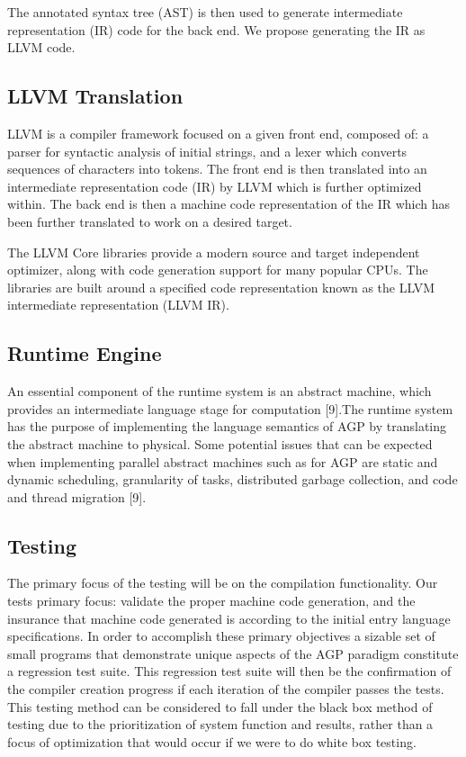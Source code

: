 \documentclass[11pt]{article}
\begin{document}
The annotated syntax tree (AST) is then used to generate intermediate representation (IR) code for the back end. We propose generating the IR as LLVM code.


\subsection{LLVM Translation}

LLVM is a compiler framework focused on a given front end, composed of: a parser for syntactic analysis of initial strings,  and a lexer which converts sequences of characters into tokens. The front end is then translated into an intermediate representation code (IR) by LLVM which is further optimized within. The back end is then a machine code representation of the IR which has been further translated to work on a desired target.

The LLVM Core libraries provide a modern source and target independent optimizer, along with code generation support for many popular CPUs. The libraries are built around a specified code representation known as the LLVM intermediate representation (LLVM IR).


\subsection{Runtime Engine}

An essential component of the runtime system is an abstract machine, which provides an intermediate language stage for computation [9].The runtime system has the purpose of implementing the language semantics of AGP by translating the abstract machine to physical. Some potential issues that can be expected when implementing parallel abstract machines such as for AGP are static and dynamic scheduling, granularity of tasks, distributed garbage collection, and code and thread migration [9].

\subsection{Testing}

The primary focus of the testing will be on the compilation functionality. Our tests primary focus: validate the proper machine code generation, and the insurance that machine code generated is according to the initial entry language specifications. In order to accomplish these primary objectives a sizable set of small programs that demonstrate unique aspects of the AGP paradigm constitute a regression test suite. This regression test suite will then be the confirmation of the compiler creation progress if each iteration of the compiler passes  the tests.
This testing method can be considered to fall under the black box method of testing due to the prioritization of system function and results, rather than a focus of optimization that would occur if we were to do white box testing.
\end{document}
